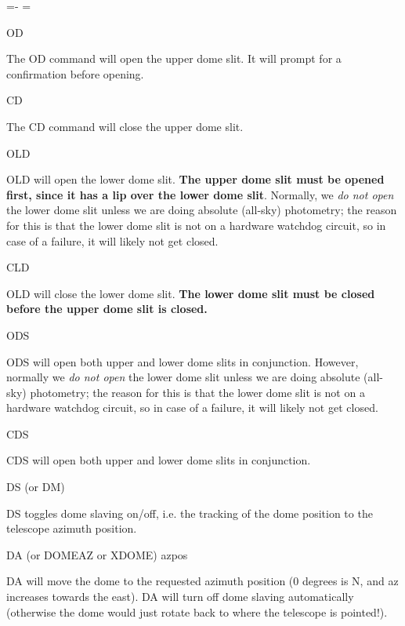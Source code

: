 \documentclass[10pt]{report}
\newenvironment{hanging}{
	\begin{list}{}{
		\labelsep=0pt
		\labelwidth=0pt
		\listparindent=0pt
		\itemindent=-\leftmargini
		\leftmargin=\leftmargini
	}
}{
	\end{list}
}
\begin{document}
\begin{hanging}
\item {OD}

The OD command will open the upper dome slit. It will prompt for a confirmation 
before opening.

\item {CD}

The CD command will close the upper dome slit. 

\item {OLD}
 
OLD will open the lower dome slit. \textbf{The upper dome slit must
be opened first, since it has a lip over the lower dome slit}.  
Normally, we \textit{do not open} the lower dome
slit unless we are doing absolute (all-sky) photometry; the reason
for this is that the lower dome slit is not on a hardware watchdog
circuit, so in case of a failure, it will likely not get closed.

\item {CLD}

OLD will close the lower dome slit. \textbf{The lower dome slit must be closed
before the upper dome slit is closed.}

\item {ODS}

ODS will open both upper and lower dome slits in conjunction.
However, normally we \textit{do not open} the lower dome slit unless we are
doing absolute (all-sky) photometry; the reason for this is that the lower
dome slit is not on a hardware watchdog circuit, so in case of a failure, it
will likely not get closed.
 
\item {CDS}

CDS will open both upper and lower dome slits in conjunction.
 
\item {DS (or DM)}

DS toggles dome slaving on/off, i.e. the tracking of the dome position to
the telescope azimuth position.

\item {DA (or DOMEAZ or XDOME) azpos}

DA will move the dome to the requested azimuth position (0 degrees is N, and
az increases towards the east). DA will turn off dome slaving automatically 
(otherwise the dome would just rotate back to where the telescope is pointed!).

\end{hanging}
\end{document}
